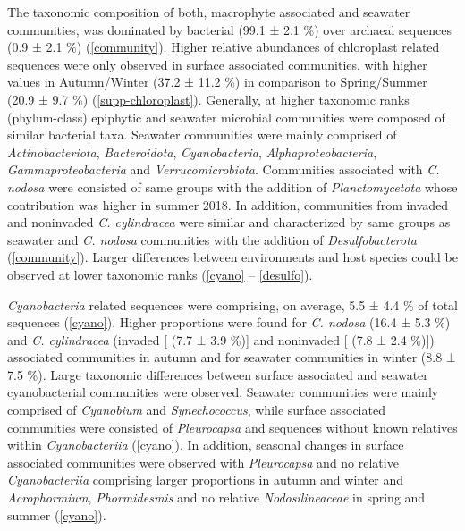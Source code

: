 \documentclass[12pt,]{article}
\begin{document}
The taxonomic composition of both, macrophyte associated and seawater
communities, was dominated by bacterial (99.1 ± 2.1 \si{\percent}) over
archaeal sequences (0.9 ± 2.1 \si{\percent}) (\autoref{community}).
Higher relative abundances of chloroplast related sequences were only
observed in surface associated communities, with higher values in
Autumn/Winter (37.2 ± 11.2 \si{\percent}) in comparison to Spring/Summer
(20.9 ± 9.7 \si{\percent}) (\autoref{supp-chloroplast}). Generally, at
higher taxonomic ranks (phylum-class) epiphytic and seawater microbial
communities were composed of similar bacterial taxa. Seawater
communities were mainly comprised of \emph{Actinobacteriota},
\emph{Bacteroidota}, \emph{Cyanobacteria}, \emph{Alphaproteobacteria},
\emph{Gammaproteobacteria} and \emph{Verrucomicrobiota}. Communities
associated with \emph{C. nodosa} were consisted of same groups with the
addition of \emph{Planctomycetota} whose contribution was higher in
summer 2018. In addition, communities from invaded and noninvaded
\emph{C. cylindracea} were similar and characterized by same groups as
seawater and \emph{C. nodosa} communities with the addition of
\emph{Desulfobacterota} (\autoref{community}). Larger differences
between environments and host species could be observed at lower
taxonomic ranks (\autoref{cyano} -- \ref{desulfo}).

\emph{Cyanobacteria} related sequences were comprising, on average, 5.5
± 4.4 \si{\percent} of total sequences (\autoref{cyano}). Higher
proportions were found for \emph{C. nodosa} (16.4 ± 5.3 \si{\percent})
and \emph{C. cylindracea} (invaded {[} (7.7 ± 3.9 \si{\percent}){]} and
noninvaded {[} (7.8 ± 2.4 \si{\percent}){]}) associated communities in
autumn and for seawater communities in winter (8.8 ± 7.5 \si{\percent}).
Large taxonomic differences between surface associated and seawater
cyanobacterial communities were observed. Seawater communities were
mainly comprised of \emph{Cyanobium} and \emph{Synechococcus}, while
surface associated communities were consisted of \emph{Pleurocapsa} and
sequences without known relatives within \emph{Cyanobacteriia}
(\autoref{cyano}). In addition, seasonal changes in surface associated
communities were observed with \emph{Pleurocapsa} and no relative
\emph{Cyanobacteriia} comprising larger proportions in autumn and winter
and \emph{Acrophormium}, \emph{Phormidesmis} and no relative
\emph{Nodosilineaceae} in spring and summer (\autoref{cyano}).
\end{document}
